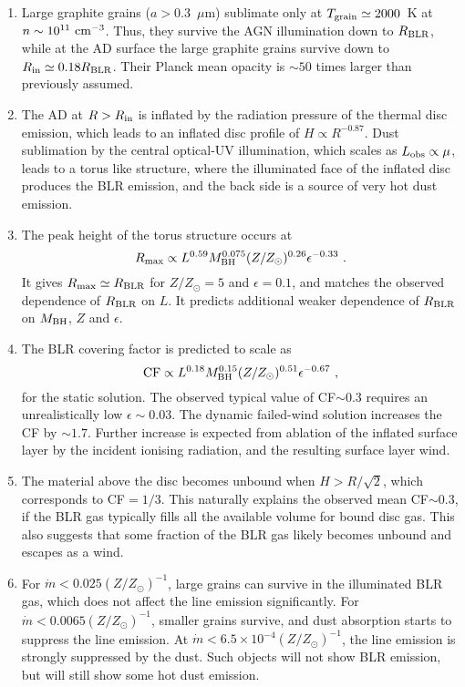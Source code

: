\documentclass[a4paper,fleqn,usenatbib]{mnras}
\newcommand{\mic}{\mbox{$\mu$m}}
\newcommand{\Tgr}{\mbox{$T_{\rm grain}$}}
\begin{document}
\begin{enumerate}

\item Large graphite grains ($a>0.3$~\mic) sublimate only at $\Tgr\simeq 2000$~K at
$n\sim 10^{11}~{\rm cm}^{-3}$. Thus, they survive the AGN illumination down to $R_{\rm BLR}$,
while at the AD surface the large graphite grains survive down to $R_{\rm in}\simeq 0.18R_{\rm BLR}$.
Their Planck mean opacity is $\sim 50$ times larger than previously assumed.

\item The AD at $R>R_{\rm in}$ is inflated by the radiation pressure of the thermal disc emission, 
which leads to an inflated disc profile of $H\propto R^{-0.87}$. 
Dust sublimation by the central optical-UV illumination, which scales as $L_{\rm obs}\propto \mu$, 
leads to a torus like structure, where the illuminated face of the inflated disc
produces the BLR emission, and the back side is a source of very hot dust emission. 

\item The peak height of the torus structure occurs at 
\[ 
R_{\rm max}\propto L^{0.59} M_{\rm BH}^{0.075}(Z/Z_{\odot})^{0.26}\epsilon^{-0.33}\ .
\] 
It gives $R_{\rm max}\simeq R_{\rm BLR}$
for $Z/Z_{\odot}=5$ and $\epsilon=0.1$, and matches the observed dependence of $R_{\rm BLR}$ on $L$.
It predicts additional weaker dependence of $R_{\rm BLR}$ on $M_{\rm BH}$, $Z$ and $\epsilon$.

\item The BLR covering factor is predicted to scale as 
\[ {\rm CF}\propto L^{0.18}M_{\rm BH}^{0.15}(Z/Z_{\odot})^{0.51}\epsilon^{-0.67}\ , \]
for the static solution. The observed typical value of CF$\sim 0.3$ requires an unrealistically 
low $\epsilon\sim 0.03$. The dynamic failed-wind solution increases the CF by $\sim 1.7$. 
Further increase is expected from ablation of the inflated surface layer by the incident 
ionising radiation, and the resulting surface layer wind.

\item The material above the disc becomes unbound when $H>R/\sqrt{2}$, which corresponds to 
CF$=1/3$. This naturally explains the observed mean CF$\sim 0.3$, if the BLR gas typically 
fills all the available volume for bound disc gas. This also suggests that some fraction of the 
BLR gas likely becomes unbound and escapes as a wind.

\item For $\dot{m}<0.025(Z/Z_{\odot})^{-1}$, large grains can survive in the illuminated BLR gas, 
which does not affect the line emission significantly. 
For $\dot{m}<0.0065(Z/Z_{\odot})^{-1}$, smaller grains survive, 
and dust absorption starts to suppress the line emission. At $\dot{m}<6.5\times 10^{-4}(Z/Z_{\odot})^{-1}$, 
the line emission is strongly suppressed by the dust. Such objects will not show BLR
emission, but will still show some hot dust emission.


\end{enumerate}
\end{document}
